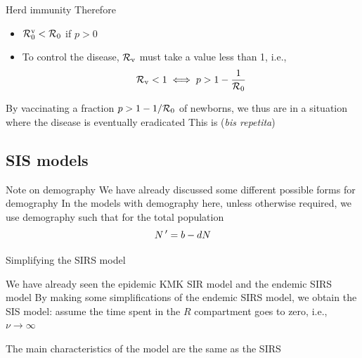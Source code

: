 \documentclass[aspectratio=169]{beamer}\usepackage[]{graphicx}\usepackage[]{xcolor}
\begin{document}
\begin{frame}{Herd immunity}
  Therefore 
  \begin{itemize}
  \item $\mathcal{R}_0^{\textrm{v}}<\mathcal{R}_0$ if $p>0$
  \item To control the disease, $\mathcal{R}_{\text{v}}$ must take a value less than 1, i.e.,
  \begin{equation}
    \mathcal{R}_{\text{v}}<1 \iff p> 1-\frac{1}{\mathcal{R}_0}
  \end{equation}
  \end{itemize}
  \vfill
  By vaccinating a fraction $p>1-1/\mathcal{R}_0$ of newborns, we thus are in a situation where the disease is eventually eradicated
  \vfill
  This is  (\emph{bis repetita})
\end{frame}


\subsection{SIS models}


\begin{frame}{Note on demography}
\bbullet We have already discussed some different possible forms for demography
\vfill
\bbullet In the models with demography here, unless otherwise required, we use demography such that for the total population
\[
N\,' = b - dN
\]
\end{frame}


\begin{frame}{Simplifying the SIRS model}
\begin{minipage}{0.2\textwidth}
  \def\skip{*-1.5}
\end{minipage}
\begin{minipage}{0.75\textwidth}
\bbullet We have already seen the epidemic KMK SIR model and the endemic SIRS model
\vskip0.5cm
\bbullet By making some simplifications of the endemic SIRS model, we obtain the SIS model: assume the time spent in the $R$ compartment goes to zero, i.e., $\nu\to\infty$
\end{minipage}
\vfill
The main characteristics of the model are the same as the SIRS
\end{frame}
\end{document}

